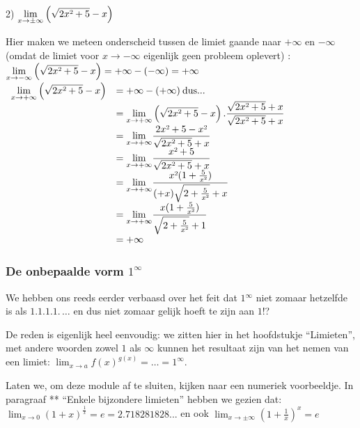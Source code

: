 2) ${\displaystyle {\displaystyle \lim_{x\to\pm\infty}}\left(\sqrt{2x\text{\texttwosuperior}+5}-x\right)}$

Hier maken we meteen onderscheid tussen de limiet gaande naar $+\infty$
en $-\infty$ (omdat de limiet voor $x\rightarrow-\infty$ eigenlijk
geen probleem oplevert) :
${\displaystyle {\displaystyle \lim_{x\to-\infty}}\left(\sqrt{2x\text{\texttwosuperior}+5}-x\right)=+\infty-(-\infty)=+\infty}$
$\begin{array}{cl}
{\displaystyle {\displaystyle {\displaystyle \lim_{x\to+\infty}}\left(\sqrt{2x\text{\texttwosuperior}+5}-x\right)}} & =+\infty-(+\infty)\:\mathrm{dus...}\\
 & {\displaystyle ={\displaystyle \lim_{x\to+\infty}}\left(\sqrt{2x\text{\texttwosuperior}+5}-x\right).\frac{\sqrt{2x\text{\texttwosuperior}+5}+x}{\sqrt{2x\text{\texttwosuperior}+5}+x}}\\
 & {\displaystyle ={\displaystyle \lim_{x\to+\infty}}\frac{2x\text{\texttwosuperior}+5-x\text{\texttwosuperior}}{\sqrt{2x\text{\texttwosuperior}+5}+x}}\\
 & {\displaystyle ={\displaystyle \lim_{x\to+\infty}}\frac{x\text{\texttwosuperior}+5}{\sqrt{2x\text{\texttwosuperior}+5}+x}}\\
 & {\displaystyle ={\displaystyle \lim_{x\to+\infty}}\frac{x\text{\texttwosuperior}(1+\frac{5}{x\text{\texttwosuperior}})}{(+x)\sqrt{2+\frac{5}{x\text{\texttwosuperior}}}+x}}\\
 & {\displaystyle ={\displaystyle \lim_{x\to+\infty}}\frac{x(1+\frac{5}{x\text{\texttwosuperior}})}{\sqrt{2+\frac{5}{x\text{\texttwosuperior}}}+1}}\\
 & =+\infty
\end{array}$ 

\subsubsection{De onbepaalde vorm $1^{\infty}$}

We hebben ons reeds eerder verbaasd over het feit dat $1{}^{\infty}$
niet zomaar hetzelfde is als $1.1.1.1.\,\ldots$ en dus niet zomaar
gelijk hoeft te zijn aan $1$!?

\noindent De reden is eigenlijk heel eenvoudig: we zitten hier in
het hoofdstukje ``Limieten'', met andere woorden zowel $1$ als
$\infty$ kunnen het resultaat zijn van het nemen van een limiet:
${\displaystyle \lim_{x\to a}f(x)^{g(x)}=\ldots=1^{\infty}}$.\medskip{}


\noindent Laten we, om deze module af te sluiten, kijken naar een
numeriek voorbeeldje. In paragraaf {*}{*} ``Enkele bijzondere limieten''
hebben we gezien dat: ${\displaystyle \lim_{x\to0}}\left(1+x\right)^{\frac{1}{x}}=e=2.718281828...$
en ook ${\displaystyle \lim_{x\to\pm\infty}}\left(1+\frac{1}{x}\right)^{x}=e$\medskip{}

